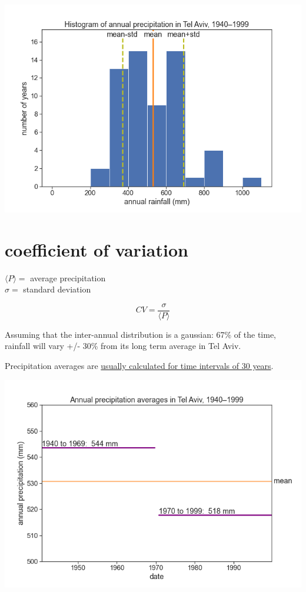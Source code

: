 \documentclass[
  letterpaper,
  DIV=11,
  numbers=noendperiod]{scrreprt}
\begin{document}
\includegraphics{archive/figures/histogram_tel_aviv_with_mean_and_std.png}

\hypertarget{coefficient-of-variation}{%
\section{coefficient of variation}\label{coefficient-of-variation}}

\(\langle{P}\rangle=\) average precipitation\\
\(\sigma=\) standard deviation

\[CV = \frac{\sigma}{\langle{P}\rangle}\]

Assuming that the inter-annual distribution is a gaussian: 67\% of the
time, rainfall will vary +/- 30\% from its long term average in Tel
Aviv.

Precipitation averages are
\href{https://www.ncdc.noaa.gov/news/defining-climate-normals-new-ways}{usually
calculated for time intervals of 30 years}.

\includegraphics{archive/figures/mean_tel_aviv_2_windows.png}
\end{document}
